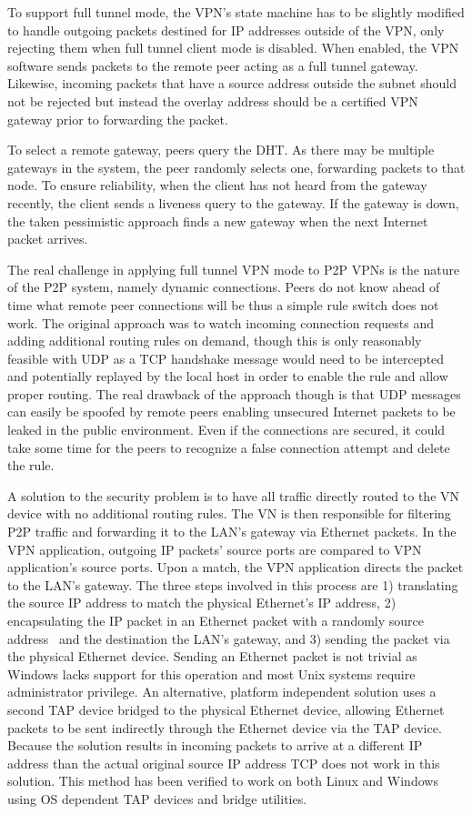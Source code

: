 To support full tunnel mode, the VPN's state machine has to be slightly modified
to handle outgoing packets destined for IP addresses outside of the VPN, only
rejecting them when full tunnel client mode is disabled.  When enabled, the VPN
software sends packets to the remote peer acting as a full tunnel gateway.
Likewise, incoming packets that have a source address outside the subnet should
not be rejected but instead the overlay address should be a certified VPN
gateway prior to forwarding the packet.

To select a remote gateway, peers query the DHT.  As there may be multiple
gateways in the system, the peer randomly selects one, forwarding packets to
that node.  To ensure reliability, when the client has not heard from the
gateway recently, the client sends a liveness query to the gateway.  If the
gateway is down, the taken pessimistic approach finds a new gateway when
the next Internet packet arrives.

The real challenge in applying full tunnel VPN mode to P2P VPNs is the nature
of the P2P system, namely dynamic connections.  Peers do not know ahead of time
what remote peer connections will be thus a simple rule switch does not work.
The original approach was to watch incoming connection requests and adding
additional routing rules on demand, though this is only reasonably feasible
with UDP as a TCP handshake message would need to be intercepted and potentially
replayed by the local host in order to enable the rule and allow proper routing.
The real drawback of the approach though is that UDP messages can easily be
spoofed by remote peers enabling unsecured Internet packets to be leaked in the
public environment.  Even if the connections are secured, it could take some
time for the peers to recognize a false connection attempt and delete the rule.

A solution to the security problem is to have all traffic directly routed to
the VN device with no additional routing rules.  The VN is then responsible for
filtering P2P traffic and forwarding it to the LAN's gateway via Ethernet
packets.  In the VPN application, outgoing IP packets' source ports are
compared to VPN application's source ports.  Upon a match, the VPN application
directs the packet to the LAN's gateway.  The three steps involved in this
process are 1) translating the source IP address to match the physical
Ethernet's IP address, 2) encapsulating the IP packet in an Ethernet packet
with a randomly source address~\cite{sc09} and the destination the LAN's
gateway, and 3) sending the packet via the physical Ethernet device.  Sending
an Ethernet packet is not trivial as Windows lacks support for this operation
and most Unix systems require administrator privilege.  An alternative, platform
independent solution uses a second TAP device bridged to the physical Ethernet
device, allowing Ethernet packets to be sent indirectly through the Ethernet
device via the TAP device.  Because the solution results in incoming packets to
arrive at a different IP address than the actual original source IP address TCP
does not work in this solution.  This method has been verified to work on both
Linux and Windows using OS dependent TAP devices and bridge utilities.


